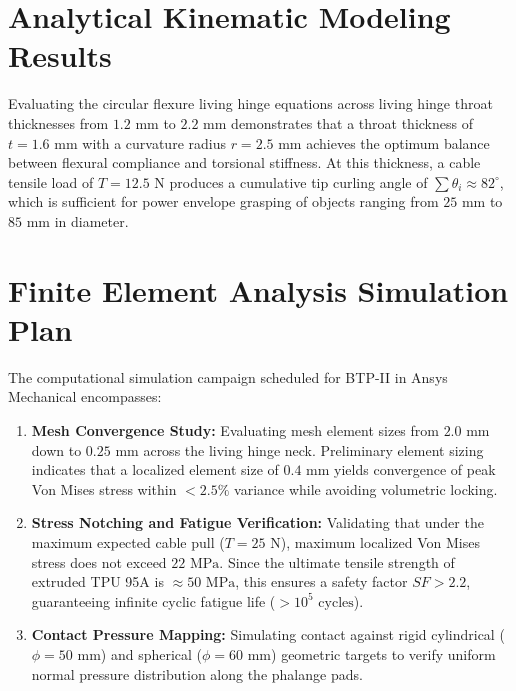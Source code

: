 \documentclass[12pt,a4paper]{report}
\begin{document}
\section{Analytical Kinematic Modeling Results}
Evaluating the circular flexure living hinge equations across living hinge throat thicknesses from $1.2\text{ mm}$ to $2.2\text{ mm}$ demonstrates that a throat thickness of $t = 1.6\text{ mm}$ with a curvature radius $r = 2.5\text{ mm}$ achieves the optimum balance between flexural compliance and torsional stiffness. At this thickness, a cable tensile load of $T = 12.5\text{ N}$ produces a cumulative tip curling angle of $\sum \theta_i \approx 82^\circ$, which is sufficient for power envelope grasping of objects ranging from $25\text{ mm}$ to $85\text{ mm}$ in diameter.

\section{Finite Element Analysis Simulation Plan}
The computational simulation campaign scheduled for BTP-II in Ansys Mechanical encompasses:
\begin{enumerate}
    \item \textbf{Mesh Convergence Study:} Evaluating mesh element sizes from $2.0\text{ mm}$ down to $0.25\text{ mm}$ across the living hinge neck. Preliminary element sizing indicates that a localized element size of $0.4\text{ mm}$ yields convergence of peak Von Mises stress within $<2.5\%$ variance while avoiding volumetric locking.
    \item \textbf{Stress Notching and Fatigue Verification:} Validating that under the maximum expected cable pull ($T = 25\text{ N}$), maximum localized Von Mises stress does not exceed $22\text{ MPa}$. Since the ultimate tensile strength of extruded TPU 95A is $\approx 50\text{ MPa}$, this ensures a safety factor $SF > 2.2$, guaranteeing infinite cyclic fatigue life ($>10^5\text{ cycles}$).
    \item \textbf{Contact Pressure Mapping:} Simulating contact against rigid cylindrical ($\phi = 50\text{ mm}$) and spherical ($\phi = 60\text{ mm}$) geometric targets to verify uniform normal pressure distribution along the phalange pads.
\end{enumerate}
\end{document}

